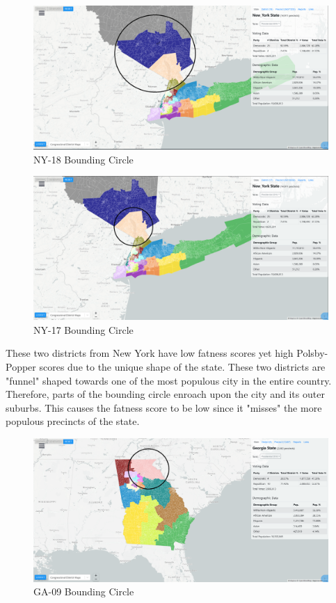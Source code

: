 \documentclass[letterpaper]{article}
\begin{document}
\begin{figure}[H]
	\includegraphics[width=\linewidth]{./figures/NY-18-BoundingCircle.png}
	\caption{NY-18 Bounding Circle}
	\label{fig:ny18boundingCircle}
\end{figure}

\begin{figure}[H]
	\includegraphics[width=\linewidth]{./figures/NY-17-BoundingCircle.png}
	\caption{NY-17 Bounding Circle}
	\label{fig:ny17boundingCircle}
\end{figure}

These two districts from New York have low fatness scores yet high Polsby-Popper scores due to the unique shape of the state. These two districts are "funnel" shaped towards one of the most populous city in the entire country. Therefore, parts of the bounding circle enroach upon the city and its outer suburbs. This causes the fatness score to be low since it "misses" the more populous precincts of the state.

\begin{figure}[H]
	\includegraphics[width=\linewidth]{./figures/GA-09-BoundingCircle.png}
	\caption{GA-09 Bounding Circle}
	\label{fig:ga09boundingCircle}
\end{figure}
\end{document}
